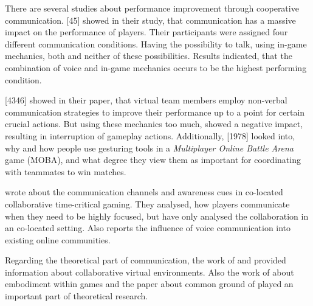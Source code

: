 There are several studies about performance improvement through cooperative communication.
\textcite{Vaddi2016Investigating2}[45] showed in their study, that communication has a massive impact on the performance of players. Their participants were assigned four different communication conditions. Having the possibility to talk, using in-game mechanics, both and neither of these possibilities.
Results indicated, that the combination of voice and in-game mechanics occurs to be the highest performing condition.

\textcite{Leavitt2016PingGames}[4346] showed in their paper, that virtual team members employ non-verbal communication strategies to improve their performance up to a point for certain crucial actions. But using these mechanics too much, showed a negative impact, resulting in interruption of gameplay actions.
Additionally, \textcite{Wuertz2017Why2}[1978] looked into, why and how people use gesturing tools in a \textit{Multiplayer Online Battle Arena} game (MOBA), and what degree they view them as important for coordinating with teammates to win matches.

\textcite{Cheung2012CommunicationGaming} wrote about the communication channels and awareness cues in co-located collaborative time-critical gaming. They analysed, how players communicate when they need to be highly focused, but have only analysed the collaboration in an co-located setting.
Also \textcite{Williams2007CanCommunity} reports the influence of voice communication into existing online communities.

Regarding the theoretical part of communication, the work of \textcite{Benford2001CollaborativeEnvironments} and \textcite{Maher2011DesignersEnvironments} provided information about collaborative virtual environments.
Also the work of \textcite{Galantucci2012TheHumans} about embodiment within games and the paper about common ground of \textcite{Clark2004GroundingCommunication.} played an important part of theoretical research.